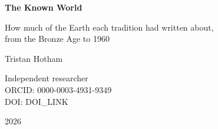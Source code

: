 \documentclass[11pt,a4paper]{article}
\begin{document}
\begin{center}
{\Large\bfseries The Known World\par}
\vspace{0.4em}
{\large How much of the Earth each tradition had written about,\\from the Bronze Age to 1960\par}
\vspace{1.2em}
{\large Tristan Hotham\par}
\vspace{0.3em}
{\small Independent researcher\\
ORCID: 0000-0003-4931-9349\\
DOI: {{DOI_LINK}}\par}
\vspace{0.8em}
2026
\end{center}
\end{document}
